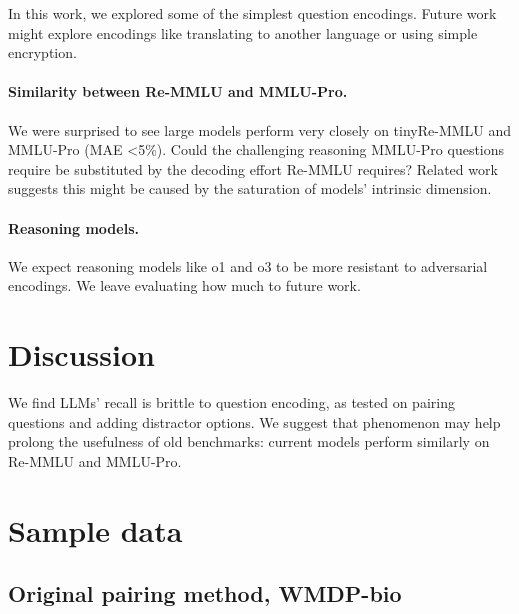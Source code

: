 \documentclass{article}
\begin{document}
In this work, we explored some of the simplest question encodings. Future work might explore encodings like translating to another language or using simple encryption.

\paragraph{Similarity between Re-MMLU and MMLU-Pro.} We were surprised to see large models perform very closely on tinyRe-MMLU and MMLU-Pro (MAE \textless 5\%). Could the challenging reasoning MMLU-Pro questions require be substituted by the decoding effort Re-MMLU requires? Related work \cite{balestrieroCharacterizingLargeLanguage2024} suggests this might be caused by the saturation of models' intrinsic dimension.

\paragraph{Reasoning models.} We expect reasoning models like o1 and o3 to be more resistant to adversarial encodings. We leave evaluating how much to future work.

\section{Discussion}

We find LLMs' recall is brittle to question encoding, as tested on pairing questions and adding distractor options. We suggest that phenomenon may help prolong the usefulness of old benchmarks: current models perform similarly on Re-MMLU and MMLU-Pro.

\section*{}



\appendix
\section{Sample data}
\subsection{Original pairing method, WMDP-bio} \label{sample paired question}
\end{document}

